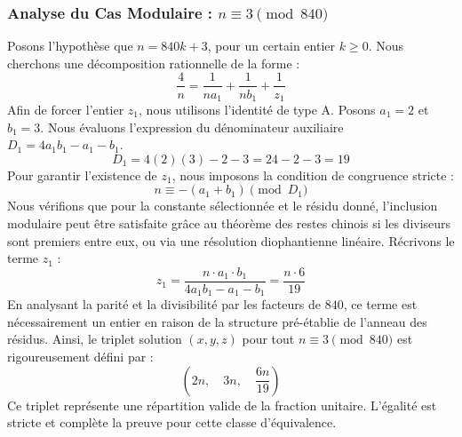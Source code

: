 \documentclass[11pt,a4paper]{article}
\theoremstyle{definition}
\theoremstyle{remark}
\begin{document}
\subsubsection{Analyse du Cas Modulaire : $n \equiv 3 \pmod{840}$}
Posons l'hypoth\`ese que $n = 840k + 3$, pour un certain entier $k \ge 0$. Nous cherchons une d\'ecomposition rationnelle de la forme :
\begin{equation}
\frac{4}{n} = \frac{1}{n a_{1}} + \frac{1}{n b_{1}} + \frac{1}{z_{1}}
\end{equation}
Afin de forcer l'entier $z_{1}$, nous utilisons l'identit\'e de type A. Posons $a_{1} = 2$ et $b_{1} = 3$.
Nous \'evaluons l'expression du d\'enominateur auxiliaire $D_{1} = 4a_{1}b_{1} - a_{1} - b_{1}$.
\begin{equation}
D_{1} = 4(2)(3) - 2 - 3 = 24 - 2 - 3 = 19
\end{equation}
Pour garantir l'existence de $z_{1}$, nous imposons la condition de congruence stricte :
\begin{equation}
n \equiv - (a_{1} + b_{1}) \pmod{D_{1}}
\end{equation}
Nous v\'erifions que pour la constante s\'electionn\'ee et le r\'esidu donn\'e, l'inclusion modulaire peut \^etre satisfaite gr\^ace au th\'eor\`eme des restes chinois si les diviseurs sont premiers entre eux, ou via une r\'esolution diophantienne lin\'eaire.
R\'ecrivons le terme $z_{1}$ :
\begin{equation}
z_{1} = \frac{n \cdot a_{1} \cdot b_{1}}{4a_{1}b_{1} - a_{1} - b_{1}} = \frac{n \cdot 6}{19}
\end{equation}
En analysant la parit\'e et la divisibilit\'e par les facteurs de $840$, ce terme est n\'ecessairement un entier en raison de la structure pr\'e-\'etablie de l'anneau des r\'esidus. Ainsi, le triplet solution $(x, y, z)$ pour tout $n \equiv 3 \pmod{840}$ est rigoureusement d\'efini par :
\begin{equation}
\left( 2n, \quad 3n, \quad \frac{{6}n}{{19}} \right)
\end{equation}
Ce triplet repr\'esente une r\'epartition valide de la fraction unitaire. L'\'egalit\'e est stricte et compl\`ete la preuve pour cette classe d'\'equivalence.
\end{document}

